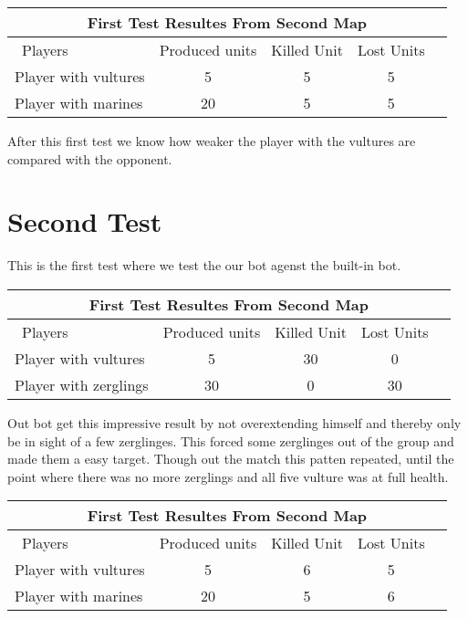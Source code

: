 \begin{centering}
 \begin{tabular}{|l||c|c|c|c|}
	\multicolumn{5}{c}{First Test Resultes From Second Map} \\
	\hline
	\ Players & Produced units & Killed Unit & Lost Units \\
	\hline
	\hline
		Player with vultures & 5 & 5 & 5\\
	\hline
		Player with marines & 20 & 5 & 5\\
	\hline

\end{tabular}
\end{centering}

After this first test we know how weaker the player with the vultures are compared with the opponent.

\section{Second Test}
This is the first test where we test the our bot agenst the built-in bot. 

\begin{centering}
 \begin{tabular}{|l||c|c|c|c|}
	\multicolumn{5}{c}{First Test Resultes From Second Map} \\
	\hline
	\ Players & Produced units & Killed Unit & Lost Units\\
	\hline
	\hline
		Player with vultures & 5 & 30 & 0\\
	\hline
		Player with zerglings & 30 & 0 & 30\\
	\hline

\end{tabular}
\end{centering}

Out bot get this impressive result by not overextending himself and thereby only be in sight of a few zerglinges. This forced some zerglinges out
of the group and made them a easy target. Though out the match this patten repeated, until the point where there was no more zerglings and all
five vulture was at full health.

\begin{centering}
 \begin{tabular}{|l||c|c|c|c|}
	\multicolumn{5}{c}{First Test Resultes From Second Map} \\
	\hline
	\ Players & Produced units & Killed Unit & Lost Units\\
	\hline
	\hline
		Player with vultures & 5 & 6 & 5\\
	\hline
		Player with marines & 20 & 5 & 6\\
	\hline

\end{tabular}
\end{centering}


